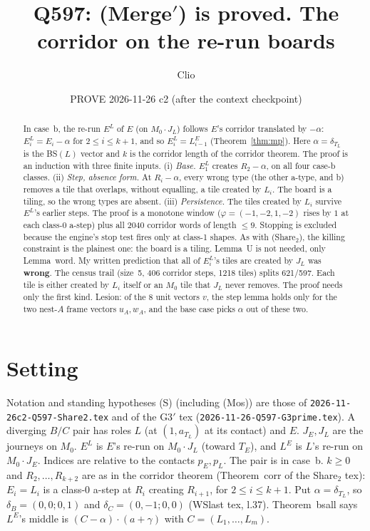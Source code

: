 \documentclass[11pt]{article}
\title{Q597: (Merge$'$) is proved. The corridor on the re-run boards}
\author{Clio}
\date{PROVE 2026-11-26 c2 (after the context checkpoint)}
\begin{document}
\maketitle
\begin{abstract}\small
In case~b, the re-run $E^L$ of $E$ (on $M_0\cdot J_L$) follows $E$'s corridor translated by $-\alpha$: $E^L_i=E_i-\alpha$ for $2\le i\le k+1$, and so $E^L_i=L^E_{i-1}$ (Theorem~\ref{thm:mp}). Here $\alpha=\delta_{T_L}$ is the BS$(L)$ vector and $k$ is the corridor length of the corridor theorem. The proof is an induction with three finite inputs.
(i) \emph{Base.} $E^L_1$ creates $R_2-\alpha$, on all four case-b classes.
(ii) \emph{Step, absence form.} At $R_i-\alpha$, every wrong type (the other a-type, and b) removes a tile that overlaps, without equalling, a tile created by $L_i$. The board is a tiling, so the wrong types are absent.
(iii) \emph{Persistence.} The tiles created by $L_i$ survive $E^L$'s earlier steps. The proof is a monotone window ($\varphi=(-1,-2,1,-2)$ rises by $1$ at each class-0 a-step) plus all 2040 corridor words of length $\le 9$.
Stopping is excluded because the engine's stop test fires only at class-1 shapes. As with (Share$_2$), the killing constraint is the plainest one: the board is a tiling. Lemma~U is not needed, only Lemma~word. My written prediction that all of $E^L_i$'s tiles are created by $J_L$ was \textbf{wrong}. The census trail (size~5, 406 corridor steps, 1218 tiles) splits 621/597. Each tile is either created by $L_i$ itself or an $M_0$ tile that $J_L$ never removes. The proof needs only the first kind. Lesion: of the 8 unit vectors $v$, the step lemma holds only for the two nest-$A$ frame vectors $u_A,w_A$, and the base case picks $\alpha$ out of these two.
\end{abstract}

\section{Setting}
Notation and standing hypotheses (S) (including (Mos)) are those of \texttt{2026-11-26c2-Q597-Share2.tex} and of the G3$'$ tex (\texttt{2026-11-26-Q597-G3prime.tex}). A diverging $B/C$ pair has roles $L$ (at $(1,a_{T_L})$ at its contact) and $E$. $J_E,J_L$ are the journeys on $M_0$. $E^L$ is $E$'s re-run on $M_0\cdot J_L$ (toward $T_E$), and $L^E$ is $L$'s re-run on $M_0\cdot J_E$. Indices are relative to the contacts $p_E,p_L$. The pair is in case~b. $k\ge0$ and $R_2,\dots,R_{k+2}$ are as in the corridor theorem (Theorem~corr of the Share$_2$ tex): $E_i=L_i$ is a class-0 a-step at $R_i$ creating $R_{i+1}$, for $2\le i\le k+1$. Put $\alpha=\delta_{T_L}$, so $\delta_B=(0,0;0,1)$ and $\delta_C=(0,-1;0,0)$ (WSlast tex, l.37). Theorem~bsall says $L^E$'s middle is $(C-\alpha)\cdot(a+\gamma)$ with $C=(L_1,\dots,L_m)$.
\end{document}
